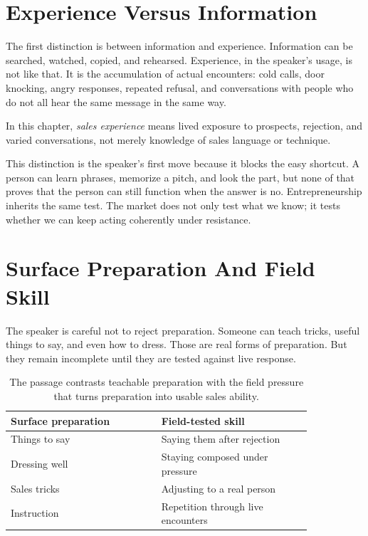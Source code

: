 \section{Experience Versus Information}

The first distinction is between information and experience. Information can be searched, watched, copied, and rehearsed. Experience, in the speaker's usage, is not like that. It is the accumulation of actual encounters: cold calls, door knocking, angry responses, repeated refusal, and conversations with people who do not all hear the same message in the same way.

\begin{definition}
In this chapter, \emph{sales experience} means lived exposure to prospects, rejection, and varied conversations, not merely knowledge of sales language or technique.
\end{definition}

This distinction is the speaker's first move because it blocks the easy shortcut. A person can learn phrases, memorize a pitch, and look the part, but none of that proves that the person can still function when the answer is no. Entrepreneurship inherits the same test. The market does not only test what we know; it tests whether we can keep acting coherently under resistance.

\section{Surface Preparation And Field Skill}

The speaker is careful not to reject preparation. Someone can teach tricks, useful things to say, and even how to dress. Those are real forms of preparation. But they remain incomplete until they are tested against live response.

\begin{table}
\centering
\begin{tabular}{p{0.42\linewidth}p{0.42\linewidth}}
\hline
Surface preparation & Field-tested skill \\
\hline
Things to say & Saying them after rejection \\
Dressing well & Staying composed under pressure \\
Sales tricks & Adjusting to a real person \\
Instruction & Repetition through live encounters \\
\hline
\end{tabular}
\caption{The passage contrasts teachable preparation with the field pressure that turns preparation into usable sales ability.}
\end{table}

